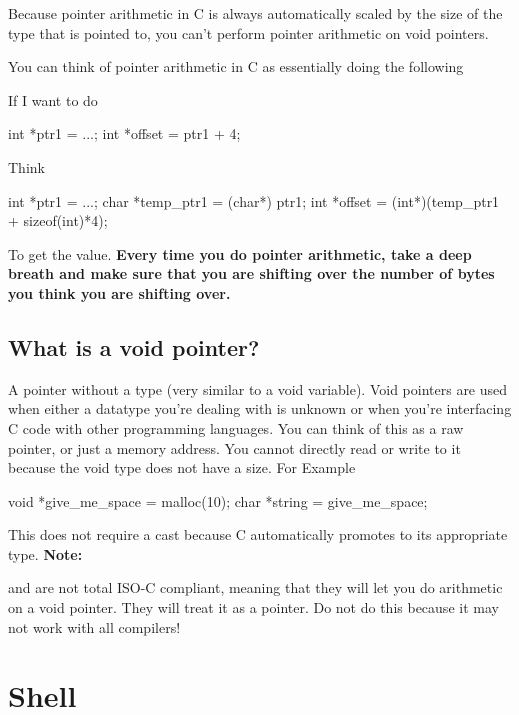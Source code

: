 Because pointer arithmetic in C is always automatically scaled by the
size of the type that is pointed to, you can't perform pointer
arithmetic on void pointers.

You can think of pointer arithmetic in C as essentially doing the
following

If I want to do

\begin{code}[language=C]
int *ptr1 = ...;
int *offset = ptr1 + 4;
\end{code}

Think

\begin{code}[language=C]
int *ptr1 = ...;
char *temp_ptr1 = (char*) ptr1;
int *offset = (int*)(temp_ptr1 + sizeof(int)*4);
\end{code}

To get the value. \textbf{Every time you do pointer arithmetic, take a
deep breath and make sure that you are shifting over the number of bytes
you think you are shifting over.}

\subsection{What is a void pointer?}

A pointer without a type (very similar to a void variable). Void pointers are used when either a datatype you're dealing with is unknown or when you're interfacing C code with other programming languages. You can think of this as a raw pointer, or just a memory address. You cannot directly read or write to it because the void type does not have a size. For Example

\begin{code}[language=C]
void *give_me_space = malloc(10);
char *string = give_me_space;
\end{code}

This does not require a cast because C automatically promotes  to its appropriate type. \textbf{Note:}

 and  are not total ISO-C compliant, meaning that they will let you do arithmetic on a void pointer. They will treat it as a  pointer. Do not do this because it may not work with all compilers!

\section{Shell}

